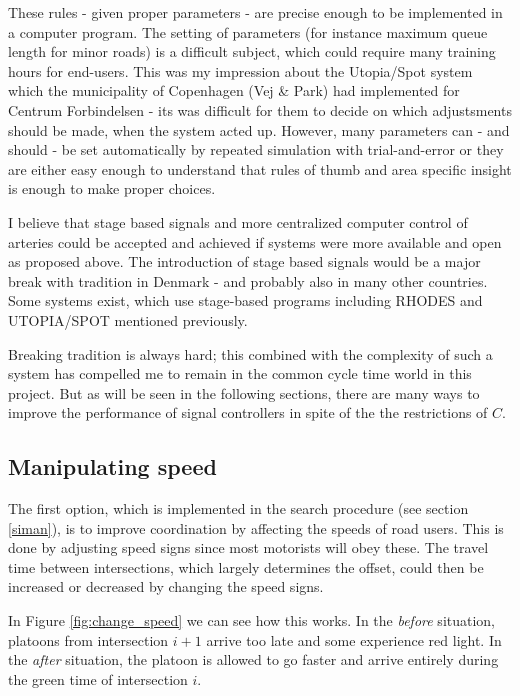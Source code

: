 These rules - given proper parameters - are precise enough to be implemented in a computer program. The setting of parameters (for instance maximum queue length for minor roads) is a difficult subject, which could require many training hours for end-users. This was my impression about the Utopia/Spot system which the municipality of Copenhagen (Vej \& Park) had implemented for Centrum Forbindelsen - its was difficult for them to decide on which adjustsments should be made, when the system acted up. 
However, many parameters can - and should - be set automatically by repeated simulation with trial-and-error or they are either easy enough to understand that rules of thumb and area specific insight is enough to make proper choices.

I believe that stage based signals and more centralized computer control of arteries could be accepted and achieved if systems were more available and open as proposed above. The introduction of stage based signals would be a major break with tradition in Denmark - and probably also in many other countries. Some systems exist, which use stage-based programs including RHODES \cite{rhodes} and UTOPIA/SPOT \cite{utopia_spot} mentioned previously.

Breaking tradition is always hard; this combined with the complexity of such a system has compelled me to remain in the common cycle time world in this project. But as will be seen in the following sections, there are many ways to improve the performance of signal controllers in spite of the the restrictions of $C$.

\subsection{Manipulating speed}

The first option, which is implemented in the search procedure (see section \ref{siman}), is to improve coordination by affecting the speeds of road users. This is done by adjusting speed signs since most motorists will obey these. The travel time between intersections, which largely determines the offset, could then be increased or decreased by changing the speed signs. 

In Figure \ref{fig:change_speed} we can see how this works. In the \textit{before} situation, platoons from intersection $i+1$ arrive too late and some experience red light. In the \textit{after} situation, the platoon is allowed to go faster and arrive entirely during the green time of intersection $i$.

